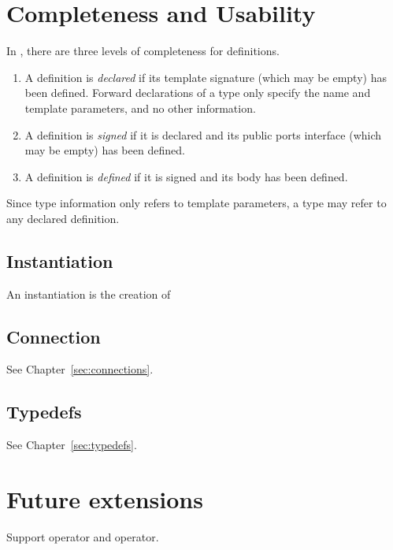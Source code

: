 \section{Completeness and Usability}
\label{sec:types:completeness}

In \artxx, there are three levels of completeness for definitions.  

\begin{enumerate}
\item A definition is \emph{declared}
	if its template signature (which may be empty) has been defined.  
	Forward declarations of a type only specify the name
	and template parameters, and no other information.  
\item A definition is \emph{signed} if it is declared 
	and its public ports interface (which may be empty) has been defined.  
\item A definition is \emph{defined} if it is signed
	and its body has been defined.  
\end{enumerate}

Since type information only refers to template parameters, 
a type may refer to any declared definition.  

\subsection{Instantiation}
\label{sec:types:completeness:instantiation}

An instantiation is the creation of 

\subsection{Connection}
\label{sec:types:completeness:connection}

See Chapter~\ref{sec:connections}.  

\subsection{Typedefs}
\label{sec:types:completeness:typedefs}

See Chapter~\ref{sec:typedefs}.  

\section{Future extensions}
\label{sec:types:future}

Support  operator and  operator.  


